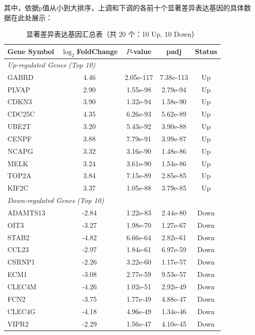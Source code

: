 \documentclass{article}
\begin{document}
其中，依据p值从小到大排序，上调和下调的各前十个显著差异表达基因的具体数据在此处展示：

\begin{table}[H]
    \centering
    \caption{显著差异表达基因汇总表（共 20 个：10 Up, 10 Down）}
    \label{tab:all_degs_complete}
    \small 
    \begin{tabular}{lcccc}
        \toprule
        \textbf{Gene Symbol} & \textbf{$\log_2$FoldChange} & \textbf{$P$-value} & \textbf{padj} & \textbf{Status} \\
        \midrule
        \multicolumn{5}{l}{\textit{Up-regulated Genes (Top 10)}} \\
        \midrule
        GABRD      & 4.46  & 2.05e-117 & 7.38e-113 & Up \\
        PLVAP      & 2.90  & 1.55e-98  & 2.79e-94  & Up \\
        CDKN3      & 3.90  & 1.32e-94  & 1.58e-90  & Up \\
        CDC25C     & 4.35  & 6.26e-93  & 5.62e-89  & Up \\
        UBE2T      & 3.20  & 5.43e-92  & 3.90e-88  & Up \\
        CENPF      & 3.88  & 7.79e-91  & 3.99e-87  & Up \\
        NCAPG      & 3.32  & 3.16e-90  & 1.48e-86  & Up \\
        MELK       & 3.24  & 3.61e-90  & 1.54e-86  & Up \\
        TOP2A      & 3.84  & 7.15e-89  & 2.85e-85  & Up \\
        KIF2C      & 3.37  & 1.05e-88  & 3.79e-85  & Up \\
        \midrule
        \multicolumn{5}{l}{\textit{Down-regulated Genes (Top 10)}} \\
        \midrule
        ADAMTS13   & -2.84 & 1.22e-83  & 2.44e-80  & Down \\
        OIT3       & -3.27 & 1.98e-70  & 1.27e-67  & Down \\
        STAB2      & -4.82 & 6.66e-64  & 2.82e-61  & Down \\
        CCL23      & -2.97 & 1.84e-61  & 6.97e-59  & Down \\
        CSRNP1     & -2.26 & 3.22e-60  & 1.17e-57  & Down \\
        ECM1       & -3.08 & 2.77e-59  & 9.53e-57  & Down \\
        CLEC4M     & -4.26 & 1.02e-51  & 2.92e-49  & Down \\
        FCN2       & -3.75 & 1.77e-49  & 4.88e-47  & Down \\
        CLEC4G     & -4.18 & 4.96e-49  & 1.34e-46  & Down \\
        VIPR2      & -2.29 & 1.56e-47  & 4.10e-45  & Down \\
        \bottomrule
    \end{tabular}
\end{table}
\end{document}
